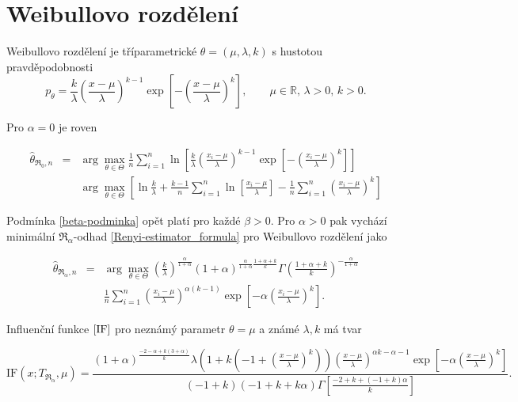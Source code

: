 \section{Weibullovo rozdělení} %

Weibullovo rozdělení je tříparametrické $\theta = (\mu,\lambda,k)$ s hustotou pravděpodobnosti
\begin{equation}
	p_\theta =  \frac{k}{\lambda} \left( \frac{x-\mu}{\lambda} \right)^{k-1} \exp \left[ -\left( \frac{x-\mu}{\lambda} \right)^k \right], \qquad \mu \in \mathbb{R}, \, \lambda>0, \, k>0.
\end{equation}

\noindent Pro $\alpha = 0$ je {\mRao} roven

\begin{eqnarray}
	\hat{\theta}_{\mathfrak{R}_0,n} & = &\arg \max_{\theta \in \Theta} \frac{1}{n} \sum^n_{i=1} \ln \left[ \frac{k}{\lambda} \left( \frac{x_i-\mu}{\lambda} \right)^{k-1} 
	\exp \left[ -\left( \frac{x_i-\mu}{\lambda} \right)^k \right]\right] \nonumber \\
	&&\arg \max_{\theta \in \Theta}\left[ \ln \frac{k}{\lambda} + \frac{k-1}{n} \sum^n_{i=1} \ln \left[  \frac{x_i-\mu}{\lambda} \right] - 
	\frac{1}{n} \sum^n_{i=1} \left(  \frac{x_i-\mu}{\lambda} \right)^k \right]
\end{eqnarray}

\noindent Podmínka \ref{beta-podminka} opět platí pro každé $\beta>0$. Pro $\alpha>0$ pak vychází minimální $\mathfrak{R}_\alpha$-odhad \eqref{Renyi-estimator_formula} pro Weibullovo rozdělení jako

\begin{eqnarray}
	\hat{\theta}_{\mathfrak{R}_\alpha,n} & = & \arg \max_{\theta \in \Theta} \left( \frac{k}{\lambda} \right)^\frac{\alpha}{1+\alpha} (1+\alpha)^{\frac{\alpha}{1+\alpha}\frac{1+\alpha+k}{k}} 
	\Gamma\left(\frac{1+\alpha+k}{k}\right)^{-\frac{\alpha}{1+\alpha}} \nonumber \\
	&& \frac{1}{n}\sum_{i=1}^n \left( \frac{x_i-\mu}{\lambda}\right)^{\alpha(k-1)} \exp\left[-\alpha \left(\frac{x_i-\mu}{\lambda}\right)^k\right].
\end{eqnarray}

Influenční funkce $\eqref{IF}$ pro neznámý parametr $\theta = \mu$ a známé $\lambda, k $  má tvar

\begin{equation}
	\mathrm{IF}(x;T_{\mathfrak{R}_\alpha},\mu) = \frac{(1+\alpha )^{\frac{-2-\alpha +k (3+\alpha )}{k}} \lambda \left(1+k \left(-1+\left(\frac{x-\mu }{\lambda }\right)^k\right)\right) 
	 \left(\frac{x-\mu }{\lambda }\right)^{\alpha k-\alpha-1}\exp \left[-\alpha\left(\frac{x-\mu }{\lambda }\right)^k\right]}
	 {(-1+k) (-1+k+k \alpha ) \Gamma\left[\frac{-2+k+(-1+k) \alpha }{k}\right]}.
	\label{IF-weibull-mu}
\end{equation}

